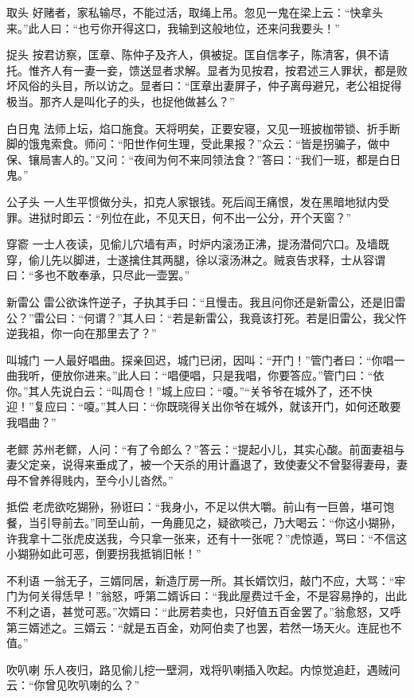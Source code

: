 \documentclass[12pt,UTF8]{ctexbook}
\begin{document}
取头
好赌者，家私输尽，不能过活，取绳上吊。忽见一鬼在梁上云：“快拿头来。”此人曰：“也亏你开得这口，我输到这般地位，还来问我要头！”

捉头
按君访察，匡章、陈仲子及齐人，俱被捉。匡自信孝子，陈清客，俱不请托。惟齐人有一妻一妾，馈送显者求解。显者为见按君，按君述三人罪状，都是败坏风俗的头目，所以访之。显者曰：“匡章出妻屏子，仲子离母避兄，老公祖捉得极当。那齐人是叫化子的头，也捉他做甚么？”

白日鬼
法师上坛，焰口施食。天将明矣，正要安寝，又见一班披枷带锁、折手断脚的饿鬼索食。师问：“阳世作何生理，受此果报？”众云：“皆是拐骗子，做中保、镶局害人的。”又问：“夜间为何不来同领法食？”答曰：“我们一班，都是白日鬼。”

公子头
一人生平惯做分头，扣克人家银钱。死后阎王痛恨，发在黑暗地狱内受罪。进狱时即云：“列位在此，不见天日，何不出一公分，开个天窗？”

穿窬
一士人夜读，见偷儿穴墙有声，时炉内滚汤正沸，提汤潜伺穴口。及墙既穿，偷儿先以脚进，士遂擒住其两腿，徐以滚汤淋之。贼哀告求释，士从容谓曰：“多也不敢奉承，只尽此一壶罢。”

新雷公
雷公欲诛忤逆子，子执其手曰：“且慢击。我且问你还是新雷公，还是旧雷公？”雷公曰：“何谓？”其人曰：“若是新雷公，我竟该打死。若是旧雷公，我父忤逆我祖，你一向在那里去了？”

叫城门
一人最好唱曲。探亲回迟，城门已闭，因叫：“开门！”管门者曰：“你唱一曲我听，便放你进来。”此人曰：“唱便唱，只是我唱，你要答应。”管门曰：“依你。”其人先说白云：“叫周仓！”城上应曰：“嗄。”“关爷爷在城外了，还不快迎！”复应曰：“嗄。”其人曰：“你既晓得关出你爷在城外，就该开门，如何还敢要我唱曲？”

老鳏
苏州老鳏，人问：“有了令郎么？”答云：“提起小儿，其实心酸。前面妻祖与妻父定亲，说得来垂成了，被一个天杀的用计矗退了，致使妻父不曾娶得妻母，妻母不曾养得贱内，至今小儿沓然。”

抵偿
老虎欲吃猢狲，狲诳曰：“我身小，不足以供大嚼。前山有一巨兽，堪可饱餐，当引导前去。”同至山前，一角鹿见之，疑欲啖己，乃大喝云：“你这小猢狲，许我拿十二张虎皮送我，今只拿一张来，还有十一张呢？”虎惊遁，骂曰：“不信这小猢狲如此可恶，倒要拐我抵销旧帐！”

不利语
一翁无子，三婿同居，新造厅房一所。其长婿饮归，敲门不应，大骂：“牢门为何关得恁早！”翁怒，呼第二婿诉曰：“我此屋费过千金，不是容易挣的，出此不利之语，甚觉可恶。”次婿曰：“此房若卖也，只好值五百金罢了。”翁愈怒，又呼第三婿述之。三婿云：“就是五百金，劝阿伯卖了也罢，若然一场天火。连屁也不值。”

吹叭喇
乐人夜归，路见偷儿挖一壁洞，戏将叭喇插入吹起。内惊觉追赶，遇贼问云：“你曾见吹叭喇的么？”
\end{document}
